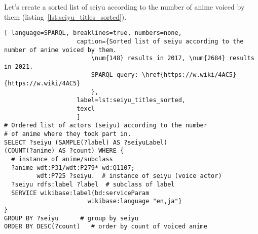 Let's create a sorted list of seiyu according to the number of anime voiced by them (listing~\protect\ref{lst:seiyu_titles_sorted}).

\begin{lstlisting}[ language=SPARQL, breaklines=true, numbers=none,
                    caption={Sorted list of seiyu according to the number of anime voiced by them.
                        \num{148} results in 2017, \num{2684} results in 2021.
                        SPARQL query: \href{https://w.wiki/4AC5}{https://w.wiki/4AC5}
                        },
                    label=lst:seiyu_titles_sorted,
                    texcl 
                    ]
# Ordered list of actors (seiyu) according to the number
# of anime where they took part in.
SELECT ?seiyu (SAMPLE(?label) AS ?seiyuLabel)
(COUNT(?anime) AS ?count) WHERE {
  # instance of anime/subclass
  ?anime wdt:P31/wdt:P279* wd:Q1107;
         wdt:P725 ?seiyu.  # instance of seiyu (voice actor)
  ?seiyu rdfs:label ?label	# subclass of label
  SERVICE wikibase:label{bd:serviceParam
					   wikibase:language "en,ja"}
}
GROUP BY ?seiyu		 # group by seiyu 
ORDER BY DESC(?count)	# order by count of voiced anime
\end{lstlisting}%